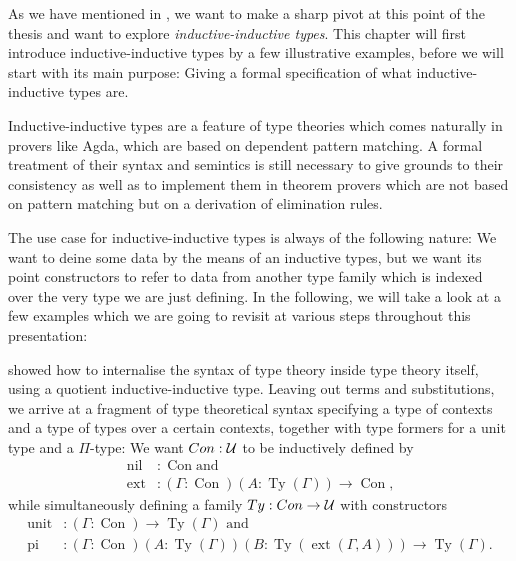 As we have mentioned in , we want to make a sharp pivot at
this point of the thesis and want to explore \emph{inductive-inductive types}.
This chapter will first introduce inductive-inductive types by a few illustrative
examples, before we will start with its main purpose:
Giving a formal specification of what inductive-inductive types are.

Inductive-inductive types are a feature of type theories which comes naturally
in provers like Agda, which are based on dependent pattern matching.
A formal treatment of their syntax and semintics is still necessary to give
grounds to their consistency as well as to implement them in theorem provers
which are not based on pattern matching but on a derivation of elimination rules.

The use case for inductive-inductive types is always of the following nature:
We want to deine some data by the means of an inductive types, but we want
its point constructors to refer to data from another type family which is indexed
over the very type we are just defining.
In the following, we will take a look at a few examples which we are going to
revisit at various steps throughout this presentation:

\begin{example}\label{ex:ttintt}
\cite{ttintt} showed how to internalise the syntax of type theory inside type
theory itself, using a quotient inductive-inductive type.
Leaving out terms and substitutions, we arrive at a fragment of type theoretical
syntax specifying a type of contexts and a type of types over a certain contexts,
together with type formers for a unit type and a $\Pi$-type:
We want $\mathop{Con} : \mathcal{U}$ to be inductively defined by
\begin{align*}
\mathop{nil}	&: \mathop{Con} \text{and } \\
\mathop{ext}	&: (\Gamma : \mathop{Con})(A : \mathop{Ty}(\Gamma)) \to \mathop{Con} \text{,}
\end{align*}
while simultaneously defining a family $\mathop{Ty} : \mathop{Con} \to \mathcal{U}$ with constructors
\begin{align*}
\mathop{unit}	&: (\Gamma : \mathop{Con}) \to \mathop{Ty}(\Gamma) \text{ and} \\
\mathop{pi}	&: (\Gamma : \mathop{Con})(A : \mathop{Ty}(\Gamma))(B : \mathop{Ty}(\mathop{ext}(\Gamma, A))) \to \mathop{Ty}(\Gamma) \text{.}
\end{align*}
\end{example}

